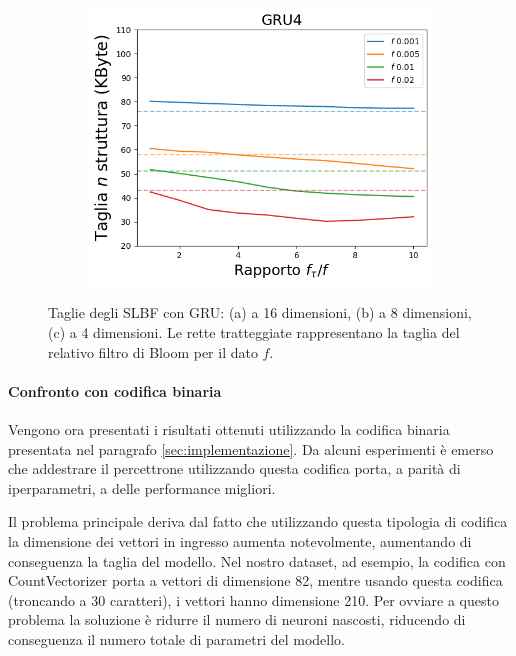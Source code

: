 \documentclass[../../main.tex]{subfiles}
\begin{document}
\begin{figure}[H]
\begin{subfigure}[b]{0.49\textwidth}
            \caption{}
            \label{fig:SLBFTagliaGRU8}
        \end{subfigure}
        \begin{subfigure}[b]{0.49\textwidth}
            \centering
            \includegraphics[width = \textwidth]{immagini/7/SLBF/GRU4_Taglia.png}
            \caption{}
            \label{fig:SLBFTagliaGRU4}
        \end{subfigure}
        \caption{Taglie degli SLBF con GRU: (a) a 16 dimensioni, (b) a 8 dimensioni, (c) a 4 dimensioni. Le rette tratteggiate rappresentano la taglia del relativo filtro di Bloom per il dato $f$.}
        \label{fig:taglieGRUSLBF}
    \end{figure}

    \paragraph{Confronto con codifica binaria}
    Vengono ora presentati i risultati ottenuti utilizzando la codifica binaria presentata nel paragrafo \ref{sec:implementazione}. Da alcuni esperimenti è emerso che addestrare il percettrone utilizzando questa codifica porta, a parità di iperparametri, a delle performance migliori. 
    
    Il problema principale deriva dal fatto che utilizzando questa tipologia di codifica la dimensione dei vettori in ingresso aumenta notevolmente, aumentando di conseguenza la taglia del modello. Nel nostro dataset, ad esempio, la codifica con CountVectorizer porta a vettori di dimensione 82, mentre usando questa codifica (troncando a 30 caratteri), i vettori hanno dimensione 210. Per ovviare a questo problema la soluzione è ridurre il numero di neuroni nascosti, riducendo di conseguenza il numero totale di parametri del modello.
\end{document}
